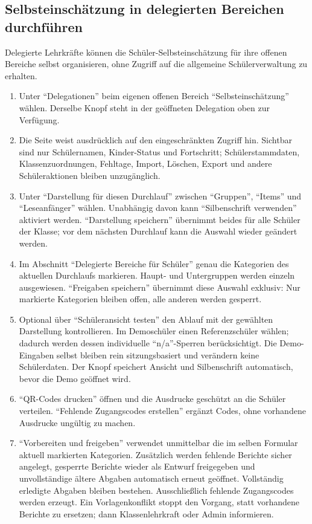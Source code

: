 \documentclass[12pt,a4paper]{article}
\begin{document}
\subsection*{Selbsteinschätzung in delegierten Bereichen durchführen}
Delegierte Lehrkräfte können die Schüler-Selbsteinschätzung für ihre offenen Bereiche selbst organisieren, ohne Zugriff auf die allgemeine Schülerverwaltung zu erhalten.
\begin{enumerate}
  \item Unter \enquote{Delegationen} beim eigenen offenen Bereich \enquote{Selbsteinschätzung} wählen. Derselbe Knopf steht in der geöffneten Delegation oben zur Verfügung.
  \item Die Seite weist ausdrücklich auf den eingeschränkten Zugriff hin. Sichtbar sind nur Schülernamen, Kinder-Status und Fortschritt; Schülerstammdaten, Klassenzuordnungen, Fehltage, Import, Löschen, Export und andere Schüleraktionen bleiben unzugänglich.
  \item Unter \enquote{Darstellung für diesen Durchlauf} zwischen \enquote{Gruppen}, \enquote{Items} und \enquote{Leseanfänger} wählen. Unabhängig davon kann \enquote{Silbenschrift verwenden} aktiviert werden. \enquote{Darstellung speichern} übernimmt beides für alle Schüler der Klasse; vor dem nächsten Durchlauf kann die Auswahl wieder geändert werden.
  \item Im Abschnitt \enquote{Delegierte Bereiche für Schüler} genau die Kategorien des aktuellen Durchlaufs markieren. Haupt- und Untergruppen werden einzeln ausgewiesen. \enquote{Freigaben speichern} übernimmt diese Auswahl exklusiv: Nur markierte Kategorien bleiben offen, alle anderen werden gesperrt.
  \item Optional über \enquote{Schüleransicht testen} den Ablauf mit der gewählten Darstellung kontrollieren. Im Demoschüler einen Referenzschüler wählen; dadurch werden dessen individuelle \enquote{n/a}-Sperren berücksichtigt. Die Demo-Eingaben selbst bleiben rein sitzungsbasiert und verändern keine Schülerdaten. Der Knopf speichert Ansicht und Silbenschrift automatisch, bevor die Demo geöffnet wird.
  \item \enquote{QR-Codes drucken} öffnen und die Ausdrucke geschützt an die Schüler verteilen. \enquote{Fehlende Zugangscodes erstellen} ergänzt Codes, ohne vorhandene Ausdrucke ungültig zu machen.
  \item \enquote{Vorbereiten und freigeben} verwendet unmittelbar die im selben Formular aktuell markierten Kategorien. Zusätzlich werden fehlende Berichte sicher angelegt, gesperrte Berichte wieder als Entwurf freigegeben und unvollständige ältere Abgaben automatisch erneut geöffnet. Vollständig erledigte Abgaben bleiben bestehen. Ausschließlich fehlende Zugangscodes werden erzeugt. Ein Vorlagenkonflikt stoppt den Vorgang, statt vorhandene Berichte zu ersetzen; dann Klassenlehrkraft oder Admin informieren.

\end{enumerate}
\end{document}
